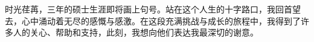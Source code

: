 \begin{ack}




时光荏苒，三年的硕士生涯即将画上句号。站在这个人生的十字路口，我回首望去，心中涌动着无尽的感慨与感激。在这段充满挑战与成长的旅程中，我得到了许多人的关心、帮助和支持，此刻，我想向他们表达我最深切的谢意。


\end{ack}
